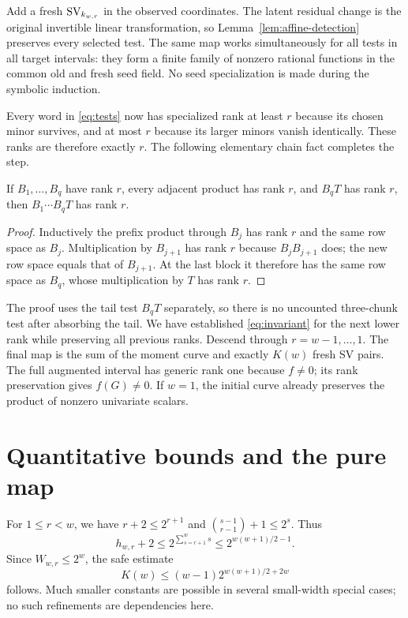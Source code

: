 Add a fresh $\operatorname{SV}_{k_{w,r}}$ in the observed coordinates. The latent
residual change is the original invertible linear transformation, so
Lemma~\ref{lem:affine-detection} preserves every selected test.
The same map works simultaneously for all tests in all target
intervals: they form a finite family of nonzero rational functions
in the common old and fresh seed field. No seed specialization is
made during the symbolic induction.

Every word in \eqref{eq:tests} now has specialized rank at least $r$
because its chosen minor survives, and at most $r$ because its larger
minors vanish identically. These ranks are therefore exactly $r$.
The following elementary chain fact completes the step.

\begin{lemma}\label{lem:chain}
If $B_1,\ldots,B_q$ have rank $r$, every adjacent product has rank
$r$, and $B_qT$ has rank $r$, then $B_1\cdots B_qT$ has rank $r$.
\end{lemma}
\begin{proof}
Inductively the prefix product through $B_j$ has rank $r$ and the
same row space as $B_j$. Multiplication by $B_{j+1}$ has rank $r$
because $B_jB_{j+1}$ does; the new row space equals that of
$B_{j+1}$. At the last block it therefore has the same row space
as $B_q$, whose multiplication by $T$ has rank $r$.
\end{proof}

The proof uses the tail test $B_qT$ separately, so there is no
uncounted three-chunk test after absorbing the tail. We have established
\eqref{eq:invariant} for the next lower rank while preserving all
previous ranks. Descend through $r=w-1,\ldots,1$. The final map is
the sum of the moment curve and exactly $K(w)$ fresh SV pairs.
The full augmented interval has generic rank one because $f\ne0$;
its rank preservation gives $f(G)\ne0$. If $w=1$, the initial curve
already preserves the product of nonzero univariate scalars.

\section{Quantitative bounds and the pure map}

For $1\le r<w$, we have $r+2\le2^{r+1}$ and
$\binom{s-1}{r-1}+1\le2^s$. Thus
\[
 h_{w,r}+2\le2^{\sum_{s=r+1}^{w}s}
             \le2^{w(w+1)/2-1}.
\]
Since $W_{w,r}\le2^w$, the safe estimate
\[
 K(w)\le(w-1)2^{w(w+1)/2+2w}
\]
follows. Much smaller constants are possible in several small-width
special cases; no such refinements are dependencies here.

